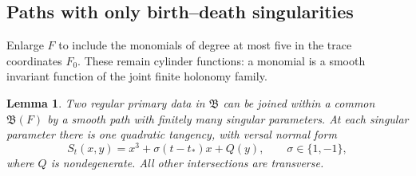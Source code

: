 \documentclass[11pt]{amsart}
\newtheorem{lemma}[theorem]{Lemma}
\theoremstyle{definition}
\theoremstyle{remark}
\theoremstyle{plain}
\numberwithin{equation}{section}
\begin{document}
\subsection{Paths with only birth--death singularities}
Enlarge $F$ to include the monomials of degree at
most five in the trace coordinates $F_0$.
These remain cylinder functions: a monomial
is a smooth invariant function of the joint
finite holonomy family.

\begin{lemma}\label{lem:generic-path}
Two regular primary data in $\mathfrak B$
can be joined within a common $\mathfrak B(F)$
by a smooth path with finitely many singular
parameters. At each singular parameter
there is one quadratic tangency, with
versal normal form
\begin{equation}\label{eq:birth-death}
 S_t(x,y)=x^3+\sigma(t-t_*)x+Q(y),
 \qquad\sigma\in\{1,-1\},
\end{equation}
where $Q$ is nondegenerate. All other
intersections are transverse.
\end{lemma}
\end{document}
